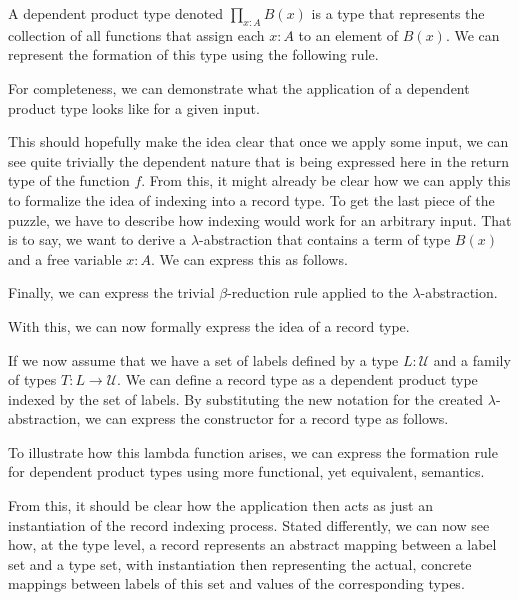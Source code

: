 \begin{definition}
 A dependent product type denoted $\prod _{x : A} B(x)$ is a type that represents the collection of all functions that assign each $x : A$ to an element of $B(x)$. We can represent the formation of this type using the following rule.
  
  
  
 For completeness, we can demonstrate what the application of a dependent product type looks like for a given input.
  
  
  
 This should hopefully make the idea clear that once we apply some input, we can see quite trivially the dependent nature that is being expressed here in the return type of the function $f$. From this, it might already be clear how we can apply this to formalize the idea of indexing into a record type. To get the last piece of the puzzle, we have to describe how indexing would work for an arbitrary input. That is to say, we want to derive a $\lambda$-abstraction that contains a term of type $B(x)$ and a free variable $x : A$. We can express this as follows.
  
  

 Finally, we can express the trivial $\beta$-reduction rule applied to the $\lambda$-abstraction.

  

\end{definition}

With this, we can now formally express the idea of a record type.

\begin{definition}
 If we now assume that we have a set of labels defined by a type $L : \mathcal {U} $ and a family of types $T : L \rightarrow \mathcal {U} $. We can define a record type as a dependent product type indexed by the set of labels. By substituting the new notation for the created $\lambda$-abstraction, we can express the constructor for a record type as follows.
  
  

 To illustrate how this lambda function arises, we can express the formation rule for dependent product types using more functional, yet equivalent, semantics.
  
  
  
 From this, it should be clear how the application then acts as just an instantiation of the record indexing process. Stated differently, we can now see how, at the type level, a record represents an abstract mapping between a label set and a type set, with instantiation then representing the actual, concrete mappings between labels of this set and values of the corresponding types.
\end{definition}

